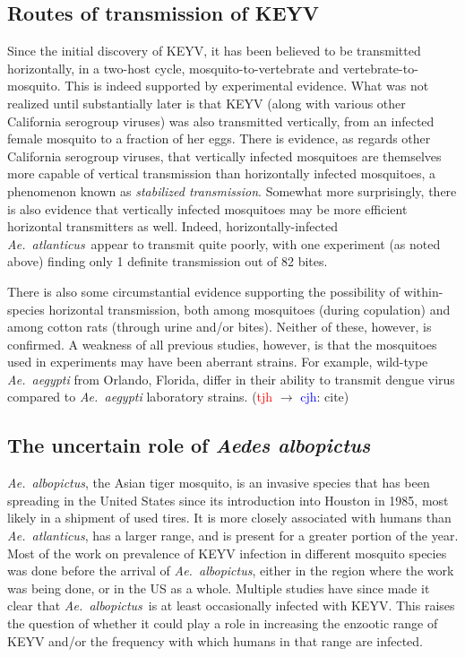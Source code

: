 \documentclass[12pt]{article}
\newcommand{\alb}{\textit{Ae.\ albopictus}}
\newcommand{\atl}{\textit{Ae.\ atlanticus}}
\newcommand{\cjh}{\textcolor{blue}{cjh}}
\newcommand{\tjh}{\textcolor{red}{tjh}}
\newcommand{\msg}[3]{(#1 $\rightarrow$ #2: #3)}
\newcommand{\mtc}[1]{\msg\tjh\cjh{#1}}
\begin{document}
        \subsection{Routes of transmission of KEYV}
            \label{transmission-routes}
            Since the initial discovery of KEYV, it has been believed to be transmitted horizontally, in a two-host cycle, mosquito-to-vertebrate and vertebrate-to-mosquito. This is indeed supported by experimental evidence. What was not realized until substantially later is that KEYV (along with various other California serogroup viruses) was also transmitted vertically, from an infected female mosquito to a fraction of her eggs. There is evidence, as regards other California serogroup viruses, that vertically infected mosquitoes are themselves more capable of vertical transmission than horizontally infected mosquitoes, a phenomenon known as \textit{stabilized transmission}. Somewhat more surprisingly, there is also evidence that vertically infected mosquitoes may be more efficient horizontal transmitters as well. Indeed, horizontally-infected \atl\ appear to transmit quite poorly, with one experiment (as noted above) finding only 1 definite transmission out of 82 bites.\cite{watts1988maintenance}

            There is also some circumstantial evidence supporting the possibility of within-species horizontal transmission, both among mosquitoes (during copulation)\cite{asdf} and among cotton rats (through urine and/or bites)\cite{taylor1971california}. Neither of these, however, is confirmed. A weakness of all previous studies, however, is that the mosquitoes used in experiments may have been aberrant strains.  For example, wild-type \emph{Ae.\ aegypti} from Orlando, Florida, differ in their ability to transmit dengue virus compared to \emph{Ae.\ aegypti} laboratory strains. \mtc{cite}

        \subsection{The uncertain role of \textit{Aedes albopictus}}
            \label{albopictus}
            \alb, the Asian tiger mosquito, is an invasive species that has been spreading in the United States since its introduction into Houston in 1985, most likely in a shipment of used tires. It is more closely associated with humans than \atl, has a larger range, and is present for a greater portion of the year. Most of the work on prevalence of KEYV infection in different mosquito species was done before the arrival of \alb, either in the region where the work was being done, or in the US as a whole. Multiple studies have since made it clear that \alb\ is at least occasionally infected with KEYV. This raises the question of whether it could play a role in increasing the enzootic range of KEYV and/or the frequency with which humans in that range are infected.
\end{document}
